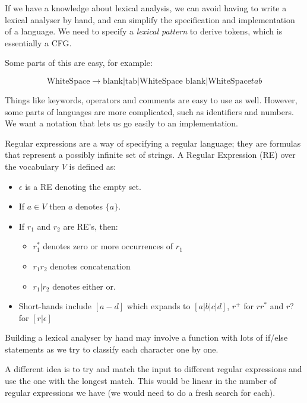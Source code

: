 
If we have a knowledge about lexical analysis, we can avoid having to write a
lexical analyser by hand, and can simplify the specification and implementation
of a language. We need to specify a \textit{lexical pattern} to derive tokens,
which is essentially a CFG.

Some parts of this are easy, for example:

\[
  \text{WhiteSpace} \rightarrow \text{blank} | \text{tab}
    | \text{WhiteSpace blank} | \text{WhiteSpace} tab
\]

Things like keywords, operators and comments are easy to use as well. However,
some parts of languages are more complicated, such as identifiers and numbers.
We want a notation that lets us go easily to an implementation.

Regular expressions are a way of specifying a regular language; they are
formulas that represent a possibly infinite set of strings. A Regular Expression
(RE) over the vocabulary $V$ is defined as:

\begin{itemize}
  \item $\epsilon$ is a RE denoting the empty set.
  \item If $a \in V$ then $a$ denotes $\{a\}$.
  \item If $r_1$ and $r_2$ are RE's, then:
  \begin{itemize}
    \item $r^{*}_1$ denotes zero or more occurrences of $r_1$
    \item $r_1r_2$ denotes concatenation
    \item $r_1|r_2$ denotes either or.
  \end{itemize}
  \item Short-hands include $[a-d]$ which expands to $[a|b|c|d]$, $r^+$ for
  $rr^*$ and $r?$ for $[r|\epsilon]$
\end{itemize}


Building a lexical analyser by hand may involve a function with lots of if/else
statements as we try to classify each character one by one.

A different idea is to try and match the input to different regular expressions
and use the one with the longest match. This would be linear in the number of
regular expressions we have (we would need to do a fresh search for each). 

